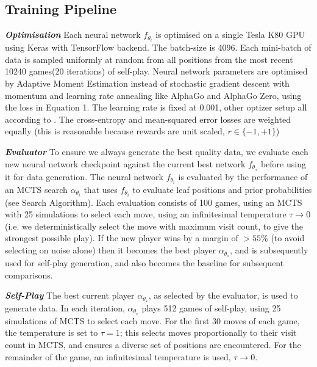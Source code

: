 \documentclass[12pt,a4paper]{article}
\begin{document}
\subsection{Training Pipeline}
\hspace{0.6cm}\textit{\textbf{Optimisation}} Each neural network \(f_{\theta_i}\) is optimised on a single Tesla K80 GPU using Keras with TensorFlow backend. The batch-size is 4096. Each mini-batch of data is sampled uniformly at random from all positions from the most recent 10240 games(20 iterations) of self-play. Neural network parameters are optimised by Adaptive Moment Estimation\cite{Adam} instead of stochastic gradient descent with momentum and learning rate annealing like AlphaGo and AlphaGo Zero, using the loss in Equation 1. The learning rate is fixed at 0.001, other optizer setup all according to \cite{Adam}. The cross-entropy and mean-squared error losses are weighted equally (this is reasonable because rewards are unit scaled, \(r \in \{−1, +1\}\))\par
\textit{\textbf{Evaluator}} To ensure we always generate the best quality data, we evaluate each new neural network checkpoint against the current best network \(f_{\theta_∗}\) before using it for data generation. The neural network \(f_{\theta_i}\) is evaluated by the performance of an MCTS search \(\alpha_{\theta_i}\) that uses \(f_{\theta_i}\) to evaluate leaf positions and prior probabilities (see Search Algorithm). Each evaluation consists of 100 games, using an MCTS with 25 simulations to select each move, using an infinitesimal temperature \(\tau \to 0\) (i.e. we deterministically select the move with maximum visit count, to give the strongest possible play). If the new player wins by a margin of \(> 55\%\) (to avoid selecting on noise alone) then it becomes the best player \(\alpha_{\theta_∗}\), and is subsequently used for self-play generation, and also becomes the baseline for subsequent comparisons.\par
\textit{\textbf{Self-Play}} The best current player \(\alpha_{\theta_∗}\), as selected by the evaluator, is used to generate data. In each iteration, \(\alpha_{\theta_∗}\) plays 512 games of self-play, using 25 simulations of MCTS to select each move. For the first 30 moves of each game, the temperature is set to \(\tau = 1\); this selects moves proportionally to their visit count in MCTS, and ensures a diverse set of positions are encountered. For the remainder of the game, an infinitesimal temperature is used, \(\tau \to 0\).\par
\end{document}
